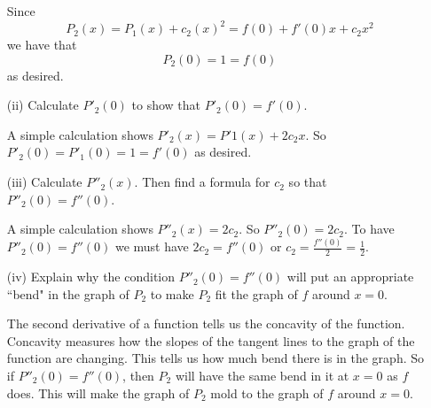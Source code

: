 \begin{pa}
\begin{itemize}
\begin{activitySolution}

Since
\[P_2(x) = P_1(x) + c_2(x)^2 = f(0) + f'(0)x + c_2x^2\]
we have that
\[P_2(0) = 1 = f(0)\]
as desired.

\end{activitySolution}

  	\item[(ii)] Calculate $P'_2(0)$ to show that $P'_2(0) = f'(0)$.

\begin{activitySolution}

A simple calculation shows $P'_2(x) = P'1(x) + 2c_2x$. So $P'_2(0) = P'_1(0) = 1 = f'(0)$ as desired.

\end{activitySolution}

   	\item[(iii)] Calculate $P''_2(x)$. Then find a formula for $c_2$ so that $P''_2(0) = f''(0)$.

\begin{activitySolution}

 A simple calculation shows $P''_2(x) = 2c_2$. So $P''_2(0) = 2c_2$. To have $P''_2(0) = f''(0)$ we must have $2c_2 = f''(0)$ or $c_2 = \frac{f''(0)}{2} = \frac{1}{2}$.

\end{activitySolution}

    \item[(iv)] Explain why the condition $P''_2(0) = f''(0)$ will put an appropriate ``bend" in the graph of $P_2$ to make $P_2$ fit the graph of $f$ around $x=0$.

\begin{activitySolution}

The second derivative of a function tells us the concavity of the function. Concavity measures how the slopes of the tangent lines to the graph of the function are changing. This tells us how much bend there is in the graph. So if  $P''_2(0) = f''(0)$, then $P_2$ will have the same bend in it at $x=0$ as $f$ does. This will make the graph of $P_2$ mold to the graph of $f$ around $x=0$.

\end{activitySolution}

    \end{itemize}

\ea

\end{pa}
\afterpa 